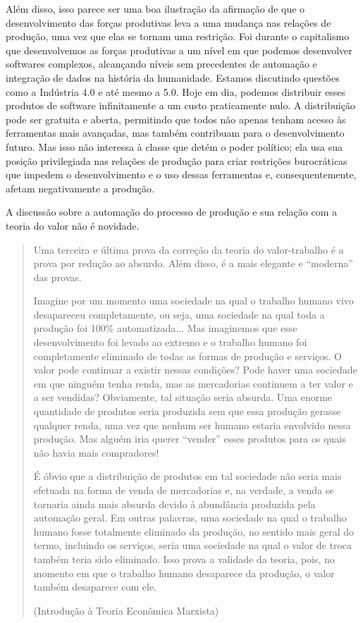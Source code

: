 Além disso, isso parece ser uma boa ilustração da afirmação de que o desenvolvimento das forças produtivas leva a uma mudança nas relações de produção, uma vez que elas se tornam uma restrição. Foi durante o capitalismo que desenvolvemos as forças produtivas a um nível em que podemos desenvolver softwares complexos, alcançando níveis sem precedentes de automação e integração de dados na história da humanidade. Estamos discutindo questões como a Indústria 4.0 e até mesmo a 5.0. Hoje em dia, podemos distribuir esses produtos de software infinitamente a um custo praticamente nulo. A distribuição pode ser gratuita e aberta, permitindo que todos não apenas tenham acesso às ferramentas mais avançadas, mas também contribuam para o desenvolvimento futuro. Mas isso não interessa à classe que detém o poder político; ela usa sua posição privilegiada nas relações de produção para criar restrições burocráticas que impedem o desenvolvimento e o uso dessas ferramentas e, consequentemente, afetam negativamente a produção.

A discussão sobre a automação do processo de produção e sua relação com a teoria do valor não é novidade.

\begin{quote}
Uma terceira e última prova da correção da teoria do valor-trabalho é a prova por redução ao absurdo. Além disso, é a mais elegante e “moderna” das provas.

Imagine por um momento uma sociedade na qual o trabalho humano vivo desapareceu completamente, ou seja, uma sociedade na qual toda a produção foi 100\% automatizada... Mas imaginemos que esse desenvolvimento foi levado ao extremo e o trabalho humano foi completamente eliminado de todas as formas de produção e serviços. O valor pode continuar a existir nessas condições? Pode haver uma sociedade em que ninguém tenha renda, mas as mercadorias continuem a ter valor e a ser vendidas? Obviamente, tal situação seria absurda. Uma enorme quantidade de produtos seria produzida sem que essa produção gerasse qualquer renda, uma vez que nenhum ser humano estaria envolvido nessa produção. Mas alguém iria querer “vender” esses produtos para os quais não havia mais compradores!

É óbvio que a distribuição de produtos em tal sociedade não seria mais efetuada na forma de venda de mercadorias e, na verdade, a venda se tornaria ainda mais absurda devido à abundância produzida pela automação geral. Em outras palavras, uma sociedade na qual o trabalho humano fosse totalmente eliminado da produção, no sentido mais geral do termo, incluindo os serviços, seria uma sociedade na qual o valor de troca também teria sido eliminado. Isso prova a validade da teoria, pois, no momento em que o trabalho humano desaparece da produção, o valor também desaparece com ele. 

(Introdução à Teoria Econômica Marxista)
\end{quote}

